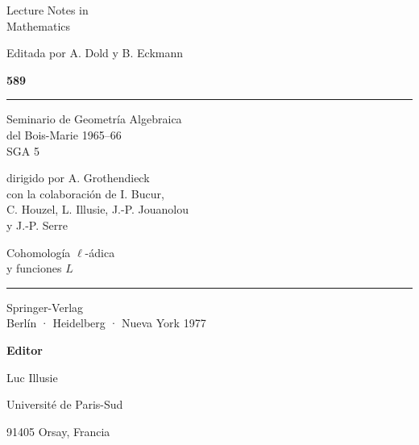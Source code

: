 \begin{titlepage}
\thispagestyle{empty}
\begin{center}
\begin{minipage}[t][0.92\textheight][s]{0.76\textwidth}
\raggedright
{\Large\sffamily Lecture Notes in\\ Mathematics}\par
\vspace{0.8em}
{Editada por A. Dold y B. Eckmann}\par
\vfill
{\Huge\bfseries 589}\par
\vspace{1.5em}
\rule{\linewidth}{0.8pt}\par
\vspace{1.5em}
{\LARGE Seminario de Geometría Algebraica\\ del Bois-Marie 1965--66\\ SGA 5}\par
\vspace{1em}
{\large dirigido por A. Grothendieck\\
con la colaboración de I. Bucur,\\
C. Houzel, L. Illusie, J.-P. Jouanolou\\
y J.-P. Serre}\par
\vfill
{\LARGE Cohomología $\ell$-ádica\\ y funciones $L$}\par
\vspace{1.5em}
\rule{\linewidth}{0.8pt}\par
\vspace{0.8em}
\par
\vspace{0.5em}
{\Large Springer-Verlag\\ Berlín · Heidelberg · Nueva York 1977}
\end{minipage}
\end{center}
\end{titlepage}

\clearpage
\thispagestyle{empty}
\hspace*{0.12\textwidth}\begin{minipage}{0.72\textwidth}
\textbf{Editor}\par
Luc Illusie\par
Université de Paris-Sud\par
91405 Orsay, Francia
\end{minipage}

